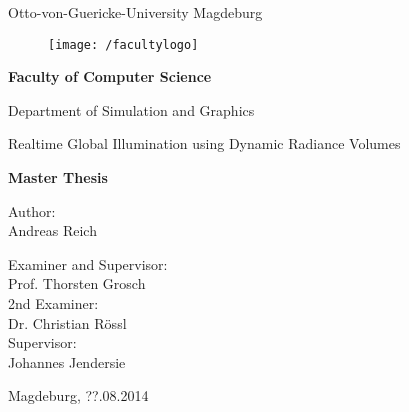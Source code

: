 \documentclass[thesis.tex]{subfiles}
\begin{document}
\thispagestyle {empty}

\begin{center}
\begin{Large}
Otto-von-Guericke-University Magdeburg\\

\begin{figure}
	\centering
	\texttt{[image: /facultylogo]}
	\label{fig:logoinffak}
\end{figure}

\vspace{3mm}

\textbf{Faculty of Computer Science}\\
\end{Large}

\vspace{3mm}

Department of Simulation and Graphics\\

\vspace{1cm}
\begin{LARGE}
Realtime Global Illumination using Dynamic Radiance Volumes\\
\end{LARGE}
\vspace{15mm}
{\Huge \textbf{Master Thesis}}\\
\vspace{15mm}

Author:\\
\vspace{4mm}
{\huge Andreas Reich}\\

\vspace{14mm}

Examiner and Supervisor:\\
\vspace{2mm}
{\Large Prof. Thorsten Grosch}\\
\vspace{4mm}
2nd Examiner:\\
\vspace{2mm}
{\Large Dr. Christian Rössl}\\
\vspace{8mm}
Supervisor:\\
\vspace{2mm}
{\Large Johannes Jendersie}\\


\vspace{20mm}

{\large Magdeburg, ??.08.2014}\\

\vspace{40mm}

\end{center}
\clearpage
\end{document}
